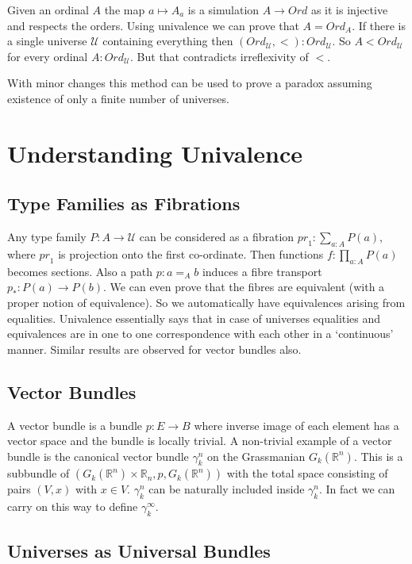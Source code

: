 \documentclass[10pt]{article}
\theoremstyle{definition}
\theoremstyle{plain}
\theoremstyle{remark}
\newcommand{\U}{\mathscr{U}}
\begin{document}
Given an ordinal $A$ the map $a \mapsto A_a$ is a simulation $A \to {Ord}$ as it is 
injective and respects the orders. Using univalence we can prove that $A = {Ord}_A$. 
If there is a single universe $\U$ containing everything then 
$({Ord}_{\U},<) : {Ord}_{\U}$. So $A < {Ord}_{\U}$ for every ordinal 
$A : {Ord}_{\U}$. But that contradicts irreflexivity of $<$.\smallskip

With minor changes this method can be used to prove a paradox assuming existence of only a
finite number of universes. 

\section{Understanding Univalence}\label{S:UU}

\subsection{Type Families as Fibrations}
Any type family $P : A \to \U$ can be considered as a fibration 
${ {pr}_1 : \sum_{a : A} P(a) }$, where ${pr}_1$ is projection onto the first
co-ordinate. Then functions $f : \prod_{a : A} P(a)$ becomes sections. Also a path 
$p : a =_A b$ induces a fibre transport $p_* : P(a) \to P(b)$. We can even prove that the 
fibres are equivalent (with a proper notion of equivalence). So we automatically have 
equivalences arising from equalities. Univalence essentially says that in case of universes
equalities and equivalences are in one to one correspondence with each other in a `continuous'
manner. Similar results are observed for vector bundles also.

\subsection{Vector Bundles}
A vector bundle is a bundle $p : E \to B$ where inverse image of each element has a 
vector space and the bundle is locally trivial. A non-trivial example of a vector bundle is 
the canonical vector bundle $\gamma^n_k$ on the Grassmanian $G_k(\mathbb{R}^n)$. This is a 
subbundle of $(G_k(\mathbb{R}^n) \times \mathbb{R}_n,p,G_k(\mathbb{R}^n))$ with the total
space consisting of pairs $(V,x)$ with $x\in V$. $\gamma^n_k$ can be naturally included 
inside $\gamma^n_k$. In fact we can carry on this way to define $\gamma^{\infty}_k$. 

\subsection{Universes as Universal Bundles}
\end{document}
